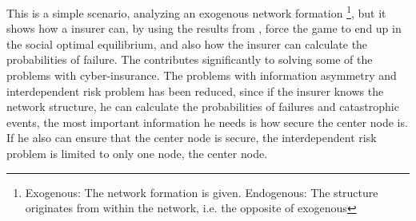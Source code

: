 This is a simple scenario, analyzing an exogenous network formation \footnote{Exogenous: The network formation is given. Endogenous: The structure originates from within the network, i.e. the opposite of exogenous}, 
but it shows how a insurer can, by using the results from \cite{lieberman2005evolutionary}, force the game to end up in the social optimal equilibrium, and also how the insurer can calculate the probabilities of failure. 
The contributes significantly to solving some of the problems with cyber-insurance. The problems with information asymmetry and interdependent risk problem has been reduced, since if the insurer knows the network structure, he can calculate the probabilities of failures and catastrophic events, the most important information he needs is how secure the center node is. If he also can ensure that the center node is secure, the interdependent risk problem is limited to only one node, the center node. 

   
